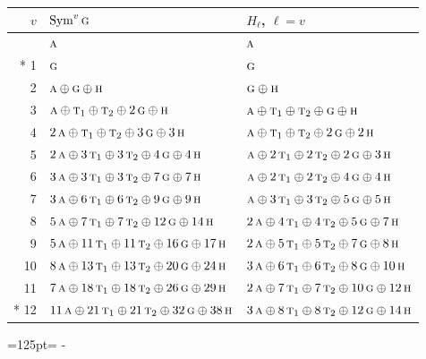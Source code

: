 \documentclass[10pt,a4paper]{article}
\newcommand{\needspace}[1]{\par\penalty-100\begingroup\dimen0=#1\relax\dimen2=\pagegoal
  \advance\dimen2-\pagetotal\ifdim\dimen0>\dimen2\relax\ifdim\dimen2>0pt\vfil\break\fi\fi
  \endgroup}
\numberwithin{equation}{section}
\newcommand{\irr}[1]{\text{\normalfont\scshape #1}}
\begin{document}
{\small\begin{longtable}{@{}rll@{}}\toprule
$v$ & $\operatorname{Sym}^{v}\irr{g}$ & $H_\ell$, $\ell = v$\\\midrule\endhead
\bottomrule\endfoot\endlastfoot
0 & $\irr{a}$ & $\irr{a}$\\*
1 & $\irr{g}$ & $\irr{g}$\\
2 & $\irr{a} \oplus \irr{g} \oplus \irr{h}$ & $\irr{g} \oplus \irr{h}$\\
3 & $\irr{a} \oplus \irr{t}_{1} \oplus \irr{t}_{2} \oplus 2\,\irr{g} \oplus \irr{h}$ & $\irr{a} \oplus \irr{t}_{1} \oplus \irr{t}_{2} \oplus \irr{g} \oplus \irr{h}$\\
4 & $2\,\irr{a} \oplus \irr{t}_{1} \oplus \irr{t}_{2} \oplus 3\,\irr{g} \oplus 3\,\irr{h}$ & $\irr{a} \oplus \irr{t}_{1} \oplus \irr{t}_{2} \oplus 2\,\irr{g} \oplus 2\,\irr{h}$\\
5 & $2\,\irr{a} \oplus 3\,\irr{t}_{1} \oplus 3\,\irr{t}_{2} \oplus 4\,\irr{g} \oplus 4\,\irr{h}$ & $\irr{a} \oplus 2\,\irr{t}_{1} \oplus 2\,\irr{t}_{2} \oplus 2\,\irr{g} \oplus 3\,\irr{h}$\\
6 & $3\,\irr{a} \oplus 3\,\irr{t}_{1} \oplus 3\,\irr{t}_{2} \oplus 7\,\irr{g} \oplus 7\,\irr{h}$ & $\irr{a} \oplus 2\,\irr{t}_{1} \oplus 2\,\irr{t}_{2} \oplus 4\,\irr{g} \oplus 4\,\irr{h}$\\
7 & $3\,\irr{a} \oplus 6\,\irr{t}_{1} \oplus 6\,\irr{t}_{2} \oplus 9\,\irr{g} \oplus 9\,\irr{h}$ & $\irr{a} \oplus 3\,\irr{t}_{1} \oplus 3\,\irr{t}_{2} \oplus 5\,\irr{g} \oplus 5\,\irr{h}$\\
8 & $5\,\irr{a} \oplus 7\,\irr{t}_{1} \oplus 7\,\irr{t}_{2} \oplus 12\,\irr{g} \oplus 14\,\irr{h}$ & $2\,\irr{a} \oplus 4\,\irr{t}_{1} \oplus 4\,\irr{t}_{2} \oplus 5\,\irr{g} \oplus 7\,\irr{h}$\\
9 & $5\,\irr{a} \oplus 11\,\irr{t}_{1} \oplus 11\,\irr{t}_{2} \oplus 16\,\irr{g} \oplus 17\,\irr{h}$ & $2\,\irr{a} \oplus 5\,\irr{t}_{1} \oplus 5\,\irr{t}_{2} \oplus 7\,\irr{g} \oplus 8\,\irr{h}$\\
10 & $8\,\irr{a} \oplus 13\,\irr{t}_{1} \oplus 13\,\irr{t}_{2} \oplus 20\,\irr{g} \oplus 24\,\irr{h}$ & $3\,\irr{a} \oplus 6\,\irr{t}_{1} \oplus 6\,\irr{t}_{2} \oplus 8\,\irr{g} \oplus 10\,\irr{h}$\\
11 & $7\,\irr{a} \oplus 18\,\irr{t}_{1} \oplus 18\,\irr{t}_{2} \oplus 26\,\irr{g} \oplus 29\,\irr{h}$ & $2\,\irr{a} \oplus 7\,\irr{t}_{1} \oplus 7\,\irr{t}_{2} \oplus 10\,\irr{g} \oplus 12\,\irr{h}$\\*
12 & $11\,\irr{a} \oplus 21\,\irr{t}_{1} \oplus 21\,\irr{t}_{2} \oplus 32\,\irr{g} \oplus 38\,\irr{h}$ & $3\,\irr{a} \oplus 8\,\irr{t}_{1} \oplus 8\,\irr{t}_{2} \oplus 12\,\irr{g} \oplus 14\,\irr{h}$\\
\bottomrule\end{longtable}}
\needspace{125pt}
\end{document}

